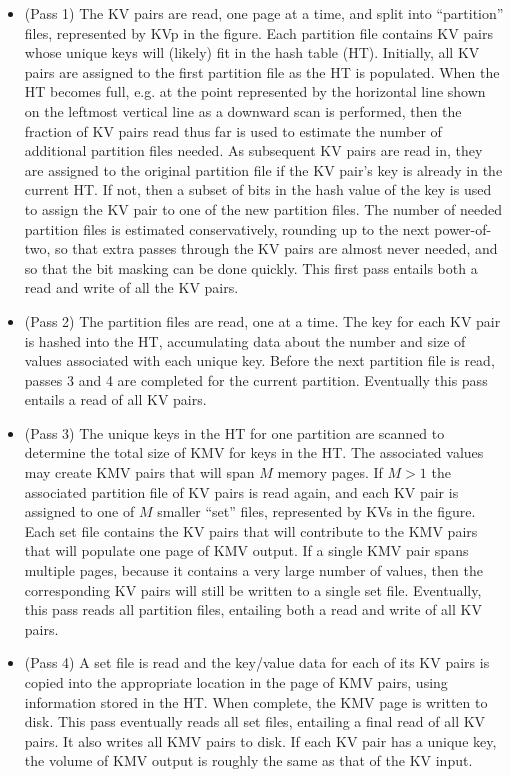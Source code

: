 \begin{itemize}

\item (Pass 1) The KV pairs are read, one page at a time, and split
into ``partition'' files, represented by KVp in the figure.  Each
partition file contains KV pairs whose unique keys will (likely) fit
in the hash table (HT).  Initially, all KV pairs are assigned to the
first partition file as the HT is populated.  When the HT becomes
full, e.g. at the point represented by the horizontal line shown on
the leftmost vertical line as a downward scan is performed, then the
fraction of KV pairs read thus far is used to estimate the number of
additional partition files needed.  As subsequent KV pairs are read
in, they are assigned to the original partition file if the KV pair's
key is already in the current HT.  If not, then a subset of bits in
the hash value of the key is used to assign the KV pair to one of the
new partition files.  The number of needed partition files is
estimated conservatively, rounding up to the next power-of-two, so
that extra passes through the KV pairs are almost never needed, and so
that the bit masking can be done quickly.  This first pass entails
both a read and write of all the KV pairs.

\item (Pass 2) The partition files are read, one at a time.  The key
for each KV pair is hashed into the HT, accumulating data about the
number and size of values associated with each unique key.  Before the
next partition file is read, passes 3 and 4 are completed for the
current partition.  Eventually this pass entails a read of all KV
pairs.

\item (Pass 3) The unique keys in the HT for one partition are
scanned to determine the total size of KMV for keys in the HT.  
The associated values may create KMV pairs that will span
$M$ memory pages.  If $M > 1$ the associated partition file of KV
pairs is read again, and each KV pair is assigned to one of $M$
smaller ``set'' files, represented by KVs in the figure.  Each set
file contains the KV pairs that will contribute to the KMV pairs that
will populate one page of KMV output.  If a single KMV pair spans
multiple pages, because it contains a very large number of values,
then the corresponding KV pairs will still be written to a single set
file.  Eventually, this pass reads all partition files, entailing both
a read and write of all KV pairs.

\item (Pass 4) A set file is read and the key/value data for each of
its KV pairs is copied into the appropriate location in the page of
KMV pairs, using information stored in the HT.  When complete, the KMV
page is written to disk.  This pass eventually reads all set files,
entailing a final read of all KV pairs.  It also writes all KMV pairs
to disk.  If each KV pair has a unique key, the volume of KMV output
is roughly the same as that of the KV input.

\end{itemize}

